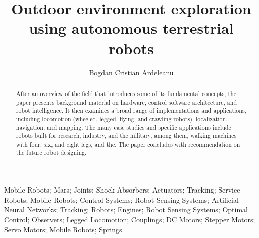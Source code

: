 \documentclass{romjist}
\begin{document}
      

    
    \title{Outdoor environment exploration using autonomous terrestrial robots}%

    \author[1]{Bogdan Cristian Ardeleanu}%
    
   

    \maketitle
    
    \begin{abstract} After an overview of the field that introduces some of its fundamental concepts, the paper presents background material on hardware, control software architecture, and robot intelligence. It then examines a broad range of implementations and applications, including locomotion (wheeled, legged, flying, and crawling robots), localization, navigation, and mapping. The many case studies and specific applications include robots built for research, industry, and the military, among them, walking machines with four, six, and eight legs, and the. The paper concludes with recommendation on the future robot designing.\end{abstract}
    
    \begin{keywords} Mobile Robots; Mars; Joints; Shock Absorbers; Actuators; Tracking; Service Robots; Mobile Robots; Control Systems; Robot Sensing Systems; Artificial Neural Networks; Tracking; Robots; Engines; Robot Sensing Systems; Optimal Control; Observers; Legged Locomotion; Couplings; DC Motors; Stepper Motors; Servo Motors; Mobile Robots; Springs. \end{keywords}
\end{document}
